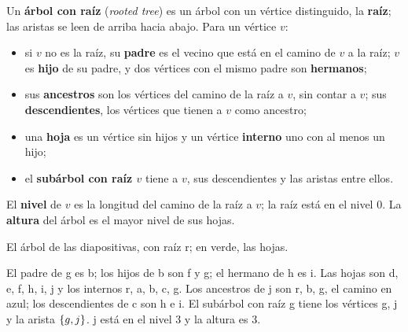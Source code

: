 \documentclass[11pt,letterpaper]{article}
\begin{document}
\begin{definicion}
  \label{def:arbol-raiz}
  Un \textbf{árbol con raíz} (\textit{rooted tree}) es un árbol con un
  vértice distinguido, la \textbf{raíz}; las aristas se leen de arriba
  hacia abajo. Para un vértice $v$:
  \begin{itemize}[itemsep=0.1em]
    \item si $v$ no es la raíz, su \textbf{padre} es el vecino que
          está en el camino de $v$ a la raíz; $v$ es \textbf{hijo} de
          su padre, y dos vértices con el mismo padre son
          \textbf{hermanos};
    \item sus \textbf{ancestros} son los vértices del camino de la
          raíz a $v$, sin contar a $v$; sus \textbf{descendientes},
          los vértices que tienen a $v$ como ancestro;
    \item una \textbf{hoja} es un vértice sin hijos y un vértice
          \textbf{interno} uno con al menos un hijo;
    \item el \textbf{subárbol con raíz $v$} tiene a $v$, sus
          descendientes y las aristas entre ellos.
  \end{itemize}
  El \textbf{nivel} de $v$ es la longitud del camino de la raíz a $v$;
  la raíz está en el nivel $0$. La \textbf{altura} del árbol es el
  mayor nivel de sus hojas.
\end{definicion}

\begin{ejemplo}
  \label{ej:arbol-vocabulario}
  El árbol de las diapositivas, con raíz r; en verde, las hojas.
  \begin{center}
  \end{center}
  El padre de g es b; los hijos de b son f y g; el hermano de h es i.
  Las hojas son d, e, f, h, i, j y los internos r, a, b, c, g. Los
  ancestros de j son r, b, g, el camino en azul; los descendientes de
  c son h e i. El subárbol con raíz g tiene los vértices g, j y la
  arista $\left\{ g, j \right\}$. j está en el nivel $3$ y la altura es $3$.
\end{ejemplo}
\end{document}
